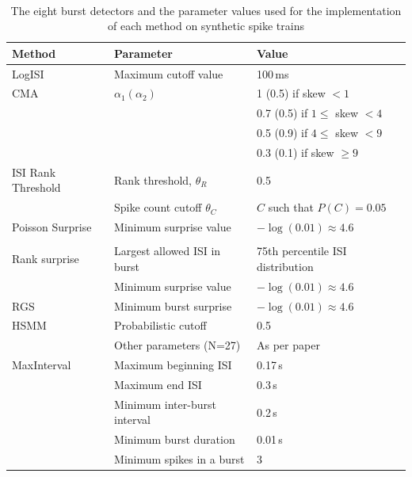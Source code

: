 \documentclass[12pt, titlepage]{article}
\begin{document}
	\pagebreak \\
	\begin{table}[h]
		\centering
		\begin{tabular}{|p{4cm}|l|l|}
			\hline
			Method & Parameter & Value
			\\ \hline 
			\rowcolor{Gray} LogISI \cite{Pasquale2010} & Maximum cutoff value & 100$\,$ms
			\\ \hline
			CMA  & $\alpha_1 (\alpha_2)$ & 1 (0.5) if skew $<1$
			\\ 
			\cite{Kapucu2012} & &  0.7 (0.5) if $1 \leq $ skew $<4$
			\\ & & 0.5 (0.9) if $4 \leq $ skew $<9$
			\\ & & 0.3 (0.1) if  skew $\geq 9$
			\\ \hline 
			\rowcolor{Gray}	ISI Rank Threshold  & Rank threshold, $\theta_R$ & 0.5 \\
			\rowcolor{Gray}\cite{Hennig2011} & Spike count cutoff $\theta_C$& $C$ such that $P(C)=0.05 $
			\\ \hline 
			Poisson Surprise & Minimum surprise value & $-\log(0.01) \approx 4.6$
			\\
			\cite{Legendy1985}&&\\ \hline 
			\rowcolor{Gray} Rank surprise& Largest allowed ISI in burst & 75th percentile ISI distribution\\
			\rowcolor{Gray}\cite{Gourevitch2007} & Minimum surprise value& $-\log(0.01) \approx 4.6$
			\\ \hline 
			RGS \cite{Ko2012} & Minimum burst surprise & $-\log(0.01) \approx 4.6$
			\\ \hline
			\rowcolor{Gray} HSMM \cite{Tokdar2010} & Probabilistic cutoff & 0.5
			\\ \rowcolor{Gray} & Other parameters (N=27) & As per paper 
			\\ \hline
			MaxInterval  & Maximum beginning ISI & 0.17$\,$s
			\\ \cite{NEmanual} & Maximum end ISI & 0.3$\,$s
			\\ & Minimum inter-burst interval & 0.2$\,$s
			\\ & Minimum burst duration & 0.01$\,$s
			\\& Minimum spikes in a burst & 3
			\\ \hline
		\end{tabular}
		\caption{The eight burst detectors and the parameter values used for the implementation of each method on synthetic spike trains}
		\label{param_vals}
	\end{table}
\end{document}
